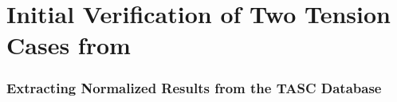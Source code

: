 \appendix


\part{Initial Verification of Two Tension Cases from \citet{allenwells2014}}

\section{Extracting Normalized Results from the TASC Database}

